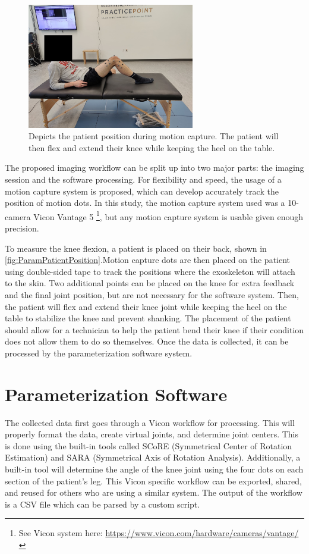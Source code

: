\begin{figure}[ht!]
    \centering
    \includegraphics[width=0.65\textwidth]{Figures/Param/StudyPatientPositioning.jpg}
    \caption{Depicts the patient position during motion capture. The patient will then flex and extend their knee while keeping the heel on the table.}
    \label{fig:ParamPatientPosition}
\end{figure}

The proposed imaging workflow can be split up into two major parts: the imaging session and the software processing. For flexibility and speed, the usage of a motion capture system is proposed, which can develop accurately track the position of motion dots. In this study, the motion capture system used was a 10-camera Vicon Vantage 5 \footnote{See Vicon system here: \url{https://www.vicon.com/hardware/cameras/vantage/}}, but any motion capture system is usable given enough precision. 

To measure the knee flexion, a patient is placed on their back, shown in \autoref{fig:ParamPatientPosition}.Motion capture dots are then placed on the patient using double-sided tape to track the positions where the exoskeleton will attach to the skin. Two additional points can be placed on the knee for extra feedback and the final joint position, but are not necessary for the software system. Then, the patient will flex and extend their knee joint while keeping the heel on the table to stabilize the knee and prevent shanking. The placement of the patient should allow for a technician to help the patient bend their knee if their condition does not allow them to do so themselves. Once the data is collected, it can be processed by the parameterization software system.

\section{Parameterization Software}
The collected data first goes through a Vicon workflow for processing. This will properly format the data, create virtual joints, and determine joint centers. This is done using the built-in tools called SCoRE (Symmetrical Center of Rotation Estimation) and SARA (Symmetrical Axis of Rotation Analysis). Additionally, a built-in tool will determine the angle of the knee joint using the four dots on each section of the patient's leg. This Vicon specific workflow can be exported, shared, and reused for others who are using a similar system. The output of the workflow is a CSV file which can be parsed by a custom script.

